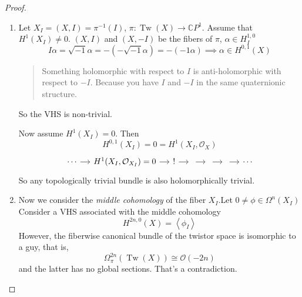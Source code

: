 \begin{proof}
\begin{enumerate}[label=\textbf{Step \arabic*}]
\item Let $X_I=(X,I)=\pi^{-1}(I)$, $\pi:\operatorname{Tw}(X)\to \mathbb{C}P^{1}$. Assume that $H^{1}(X_I)\neq 0$. $(X,I)$ and $(X,-I)$ be the fibers of  $\pi$, $\alpha\in H^{1,0}_I$
	\[I\alpha=\sqrt{-1}\alpha=-(-\sqrt{-1}\alpha)=-(-1\alpha)\implies \alpha\in H^{0,1}(X)\]
{\color{4}\begin{quotation}
	Something holomorphic with respect to $I$ is anti-holomorphic with respect to $-I$. Because you have $I$ and  $-I$ in the same quaternionic structure.
\end{quotation}}

So the VHS is non-trivial.

Now assume $H^{1}(X_I)=0$. Then
\[H^{0,1}(X_I)=0=H^{1}(X_I,\mathcal{O}_X)\]
\[\begin{tikzcd}[column sep=small]
	\cdots\arrow[r]&H^{1}(X_I,\mathcal{O}_{X_I})=0\arrow[r]&!\arrow[r]&\arrow[r]&\arrow[r]&\arrow[r]&\cdots
\end{tikzcd}\]
So any topologically trivial bundle is also holomorphically trivial.

\item Now we consider the \textit{middle cohomology} of the fiber $X_I$.Let $0\neq \phi\in\Omega^{n}(X_I)$ Consider a VHS associated with the middle cohomology
	\[H^{2n,0}(X)=\left<\phi_I\right> \]
However, the fiberwise canonical bundle of the twistor space is isomorphic to a guy, that is,
	\[\Omega^{2n}_\pi(\operatorname{Tw}(X))\cong \mathcal{O}(-2n)\]
and the latter has no global sections. That's a contradiction.


\end{enumerate}\end{proof}



